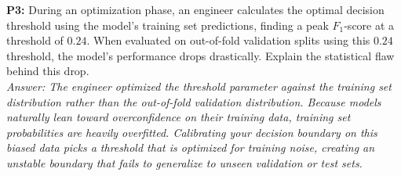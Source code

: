 \documentclass{article}
\begin{document}
\newline
\textbf{P3:} During an optimization phase, an engineer calculates the optimal decision threshold using the model's training set predictions, finding a peak $F_1$-score at a threshold of $0.24$. When evaluated on out-of-fold validation splits using this $0.24$ threshold, the model's performance drops drastically. Explain the statistical flaw behind this drop.
\\
\textit{Answer: The engineer optimized the threshold parameter against the training set distribution rather than the out-of-fold validation distribution. Because models naturally lean toward overconfidence on their training data, training set probabilities are heavily overfitted. Calibrating your decision boundary on this biased data picks a threshold that is optimized for training noise, creating an unstable boundary that fails to generalize to unseen validation or test sets.}
\end{document}
